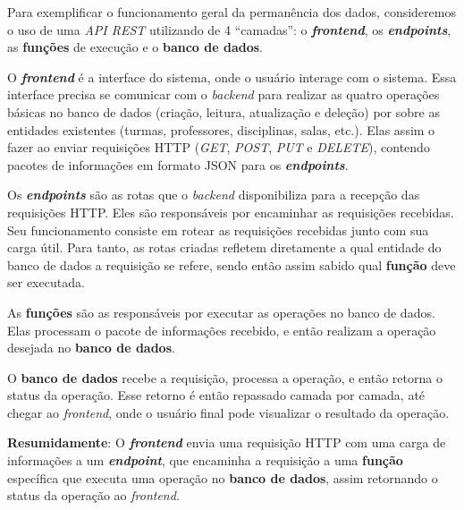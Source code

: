 Para exemplificar o funcionamento geral da permanência dos dados, consideremos o uso de uma \textit{API REST} utilizando de 4 ``camadas'': o \textbf{\textit{frontend}}, os \textbf{\textit{endpoints}}, as \textbf{funções} de execução e o \textbf{banco de dados}.


O \textbf{\textit{frontend}} é a interface do sistema, onde o usuário interage com o sistema. Essa interface precisa se comunicar com o \textit{backend} para realizar as quatro operações básicas no banco de dados (criação, leitura, atualização e deleção) por sobre as entidades existentes (turmas, professores, disciplinas, salas, etc.). Elas assim o fazer ao enviar requisições HTTP (\textit{GET}, \textit{POST}, \textit{PUT} e \textit{DELETE}), contendo pacotes de informações em formato JSON para os \textbf{\textit{endpoints}}.

Os \textbf{\textit{endpoints}} são as rotas que o \textit{backend} disponibiliza para a recepção das requisições HTTP. Eles são responsáveis por encaminhar as requisições recebidas. Seu funcionamento consiste em rotear as requisições recebidas junto com sua carga útil. Para tanto, as rotas criadas refletem diretamente a qual entidade do banco de dados a requisição se refere, sendo então assim sabido qual \textbf{função} deve ser executada.

As \textbf{funções} são as responsáveis por executar as operações no banco de dados. Elas processam o pacote de informações recebido, e então realizam a operação desejada no \textbf{banco de dados}.

O \textbf{banco de dados} recebe a requisição, processa a operação, e então retorna o status da operação. Esse retorno é então repassado camada por camada, até chegar ao \textit{frontend}, onde o usuário final pode visualizar o resultado da operação.

\textbf{Resumidamente}: O \textbf{\textit{frontend}} envia uma requisição HTTP com uma carga de informações a um \textbf{\textit{endpoint}}, que encaminha a requisição a uma \textbf{função} específica que executa uma operação no \textbf{banco de dados}, assim retornando o status da operação ao \textit{frontend}.


